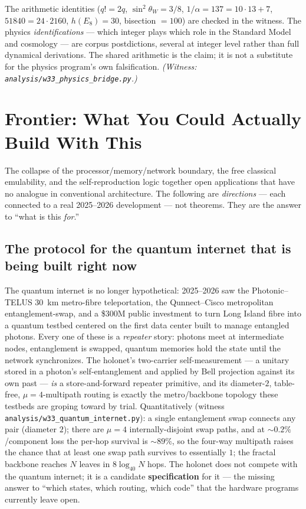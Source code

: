 \documentclass[11pt]{article}
\begin{document}
\begin{honestbox}
The arithmetic identities ($q!=2q$, $\sin^2\theta_W=3/8$, $1/\alpha=137=10\cdot13+7$,
$51840=24\cdot2160$, $h(E_8)=30$, bisection $=100$) are checked in the witness. The physics
\emph{identifications} --- which integer plays which role in the Standard Model and cosmology --- are
corpus postdictions, several at integer level rather than full dynamical derivations. The shared
arithmetic is the claim; it is not a substitute for the physics program's own falsification.
\emph{(Witness: \texttt{analysis/w33\_physics\_bridge.py}.)}
\end{honestbox}

\section{Frontier: What You Could Actually Build With This}
\label{sec:frontier}
The collapse of the processor/memory/network boundary, the free classical emulability, and the
self-reproduction logic together open applications that have no analogue in conventional architecture.
The following are \emph{directions} --- each connected to a real 2025--2026 development --- not
theorems. They are the answer to ``what is this \emph{for}.''

\subsection{The protocol for the quantum internet that is being built right now}
The quantum internet is no longer hypothetical: 2025--2026 saw the Photonic--TELUS $30$~km metro-fibre
teleportation, the Qunnect--Cisco metropolitan entanglement-swap, and a \$300M public investment to
turn Long Island fibre into a quantum testbed centered on the first data center built to manage
entangled photons. Every one of these is a \emph{repeater} story: photons meet at intermediate nodes,
entanglement is swapped, quantum memories hold the state until the network synchronizes. The holonet's
two-carrier self-measurement --- a unitary stored in a photon's self-entanglement and applied by Bell
projection against its own past --- \emph{is} a store-and-forward repeater primitive, and its
diameter-$2$, table-free, $\mu=4$-multipath routing is exactly the metro/backbone topology these
testbeds are groping toward by trial. Quantitatively (witness
\texttt{analysis/w33\_quantum\_internet.py}): a single entanglement swap connects any pair (diameter
$2$); there are $\mu=4$ internally-disjoint swap paths, and at $\sim0.2\%$/component loss the per-hop
survival is $\sim89\%$, so the four-way multipath raises the chance that at least one swap path survives
to essentially $1$; the fractal backbone reaches $N$ leaves in $8\log_{40}N$ hops. The holonet does not
compete with the quantum internet; it is a candidate \textbf{specification} for it --- the missing
answer to ``which states, which routing, which code'' that the hardware programs currently leave open.
\end{document}
